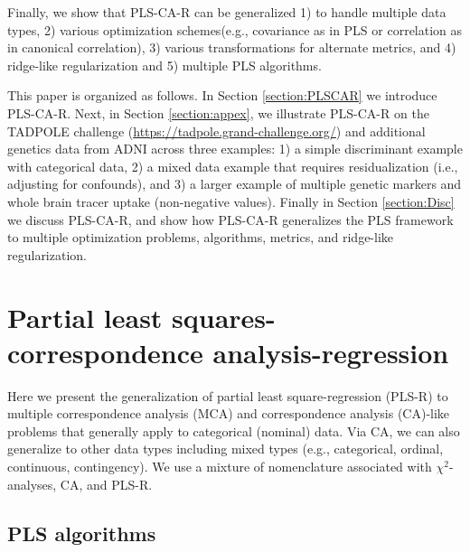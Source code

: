 \documentclass[12pt]{article}
\begin{document}
Finally, we show that PLS-CA-R can be generalized 1) to handle multiple
data types, 2) various optimization schemes(e.g., covariance as in PLS
or correlation as in canonical correlation), 3) various transformations
for alternate metrics, and 4) ridge-like regularization and 5) multiple
PLS algorithms.

This paper is organized as follows. In Section \ref{section:PLSCAR} we
introduce PLS-CA-R. Next, in Section \ref{section:appex}, we illustrate
PLS-CA-R on the TADPOLE challenge
(\url{https://tadpole.grand-challenge.org/}) and additional genetics
data from ADNI across three examples: 1) a simple discriminant example
with categorical data, 2) a mixed data example that requires
residualization (i.e., adjusting for confounds), and 3) a larger example
of multiple genetic markers and whole brain tracer uptake (non-negative
values). Finally in Section \ref{section:Disc} we discuss PLS-CA-R, and
show how PLS-CA-R generalizes the PLS framework to multiple optimization
problems, algorithms, metrics, and ridge-like regularization.

\hypertarget{partial-least-squares-correspondence-analysis-regression}{%
\section{Partial least squares-correspondence
analysis-regression}\label{partial-least-squares-correspondence-analysis-regression}}

\label{section:PLSCAR}

Here we present the generalization of partial least square-regression
(PLS-R) to multiple correspondence analysis (MCA) and correspondence
analysis (CA)-like problems that generally apply to categorical
(nominal) data. Via CA, we can also generalize to other data types
including mixed types (e.g., categorical, ordinal, continuous,
contingency). We use a mixture of nomenclature associated with
\(\chi^2\)-analyses, CA, and PLS-R.

\hypertarget{pls-algorithms}{%
\subsection{PLS algorithms}\label{pls-algorithms}}
\end{document}
